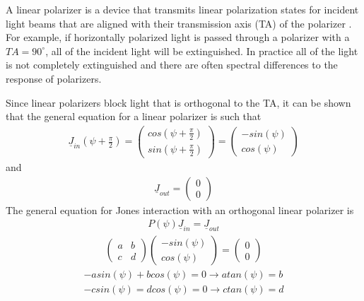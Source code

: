 A linear polarizer is a device that transmits linear polarization states for incident light beams that are aligned with their transmission axis (TA) of the polarizer \cite{polarizedlight}.  For example, if horizontally polarized light is passed through a polarizer with a $TA = 90^{\circ}$, all of the incident light will be extinguished.  In practice all of the light is not completely extinguished and there are often spectral differences to the response of polarizers.

Since linear polarizers block light that is orthogonal to the TA, it can be shown that the general equation for a linear polarizer is such that
%
\begin{align}
    \underline{J}_{in}(\psi + \frac{\pi}{2}) =
    \begin{pmatrix}
        cos(\psi + \frac{\pi}{2}) \\
        sin(\psi + \frac{\pi}{2})
    \end{pmatrix}
    =
    \begin{pmatrix}
        -sin(\psi) \\
        cos(\psi)
    \end{pmatrix}
\end{align}
%
and
\begin{align}
    \underline{J}_{out} =
    \begin{pmatrix}
        0 \\
        0
    \end{pmatrix}
\end{align}
%
The general equation for Jones interaction with an orthogonal linear polarizer is
%
\begin{align}
    P(\psi)\underline{J}_{in} = \underline{J}_{out}
\end{align}
\begin{align}
    \begin{pmatrix}
        a & b \\
        c & d
    \end{pmatrix}
    \begin{pmatrix}
        -sin(\psi) \\
        cos(\psi)
    \end{pmatrix}
    =
    \begin{pmatrix}
        0 \\
        0
    \end{pmatrix}
\end{align}
\begin{align}
    -asin(\psi) + bcos(\psi) = 0 \rightarrow atan(\psi) = b \\
    -csin(\psi) = dcos(\psi) = 0 \rightarrow ctan(\psi) = d
\end{align}
